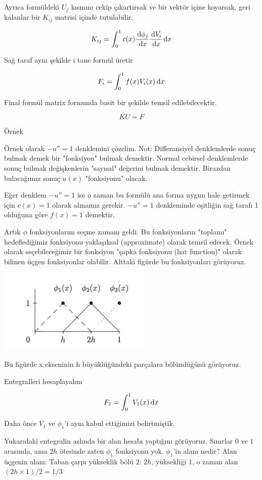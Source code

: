 \documentclass[12pt,fleqn]{article}\usepackage{../../common}
\begin{document}
Ayrıca formüldeki $U_j$ kısmını cekip çıkartırsak ve bir vektör içine koyarsak,
geri kalanlar bir $K_{ij}$ matrisi içinde tutulabilir. 

$$ K_{ij} = \int_0^1 c(x) \frac{\,\mathrm{d}\phi_j}{\,\mathrm{d} x} \frac{\,\mathrm{d} V_i}{\,\mathrm{d} x} \,\mathrm{d} x  $$

Sağ taraf aynı şekilde i tane formül üretir

$$ F_i = \int_0^1 f(x)V_i(x) \,\mathrm{d} x $$

Final formül matrix formunda basit bir şekilde temsil edilebilecektir. 

$$ KU = F $$

Örnek

Örnek olarak $-u'' = 1$ denklemini çözelim. Not: Differansiyel
denklemlerde sonuç bulmak demek bir "fonksiyon" bulmak
demektir. Normal cebirsel denklemlerde sonuç bulmak değişkenlerin
"sayısal" değerini bulmak demektir. Birazdan bulacağımız sonuç
$u(x)$ "fonksiyonu" olacak.

Eğer denklem $-u''=1$ ise o zaman bu formülü ana forma uygun hale
getirmek için $c(x) = 1$ olarak almamız gerekir. $-u''=1$ denkleminde
eşitliğin sağ tarafı 1 olduğuna göre $f(x) = 1$ demektir.

Artık $\phi$ fonksiyonlarını seçme zamanı geldi. Bu fonksiyonların
"toplamı" hedeflediğimiz fonksiyonu yaklaşıksal (approximate) olarak
temsil edecek. Örnek olarak seçebileceğimiz bir fonksiyon "şapka
fonksiyonu (hat function)" olarak bilinen üçgen fonksiyonlar
olabilir. Alttaki figürde bu fonksiyonları görüyoruz.

\includegraphics[height=4cm]{fem_hat.png}

Bu figürde x ekseninin h büyüklüğündeki parçalara bölündüğünü görüyoruz. 

Entegralleri hesaplayalım

$$ F_1 = \int_0^1 V_1(x) \,\mathrm{d} x $$

Daha önce $V_1$ ve $\phi_1$'i aynı kabul ettiğimizi belirtmiştik. 

Yukarıdaki entegralin aslında bir alan hesabı yaptığını
görüyoruz. Sınırlar $0$ ve $1$ arasında, ama $2h$ ötesinde zaten
$\phi_1$ fonksiyonu yok. $\phi_1$'in alanı nedir? Alan üçgenin alanı:
Taban çarpı yükseklik bölü 2: $2h$, yüksekliği $1$, o zaman alan $(2h
\times 1) / 2 = 1/3$
\end{document}
